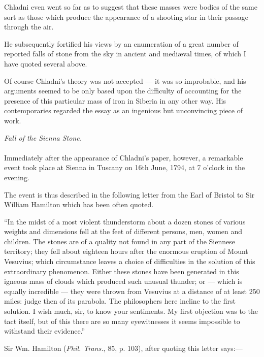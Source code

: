 \documentclass[a4paper, 12pt, oneside]{article}
\begin{document}
Chladni even went so far as to suggest that these masses were bodies of the same sort as those which produce the appearance of a shooting star in their passage through the air. 

He subsequently fortified his views by an enumeration of a great number of reported falls of stone from the sky in ancient and mediæval times, of which I have quoted several above. 

Of course Chladni's theory was not accepted --- it was so improbable, and his arguments seemed to be only based upon the difficulty of accounting for the presence of this particular mass of iron in Siberia in any other way. His contemporaries regarded the essay as an ingenious but unconvincing piece of work. 
\begin{center}
\emph{Fall of the Sienna Stone.}
\end{center}
\paragraph{}
Immediately after the appearance of Chladni's paper, however, a remarkable event took place at Sienna in Tuscany on 16th June, 1794, at 7 o'clock in the evening. 

The event is thus described in the following letter from the Earl of Bristol to Sir William Hamilton which has been often quoted. 

``In the midst of a most violent thunderstorm about a dozen stones of various weights and dimensions fell at the feet of different persons, men, women and children. The stones are of a quality not found in any part of the Siennese territory; they fell about eighteen hours after the enormous eruption of Mount Vesuvius; which circumstance leaves a choice of difficulties in the solution of this extraordinary phenomenon. Either these stones have been generated in this igneous mass of clouds which produced such unusual thunder; or --- which is equally incredible --- they were thrown from Vesuvius at a distance of at least 250 miles: judge then of its parabola. The philosophers here incline to the first solution. I wish much, sir, to know your sentiments. My first objection was to the tact itself, but of this there are so many eyewitnesses it seems impossible to withstand their evidence.'' 
\begin{center}
Sir Wm. Hamilton (\emph{Phil. Trans.}, 85, p. 103), after quoting this letter says:--- 
\end{center}
\end{document}
